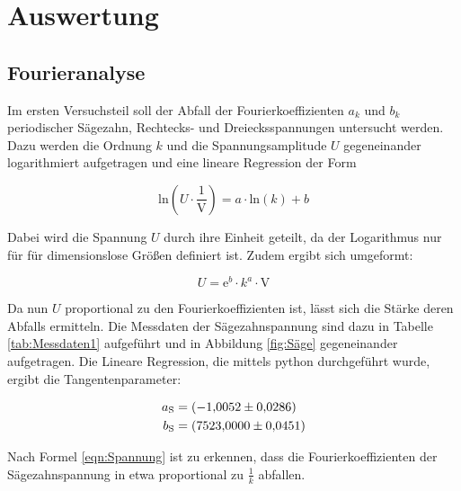 \section{Auswertung}
\label{sec:Auswertung}

\subsection{Fourieranalyse}

Im ersten Versuchsteil soll der Abfall der Fourierkoeffizienten $a_k$ und $b_k$
periodischer Sägezahn, Rechtecks- und Dreiecksspannungen untersucht werden.
Dazu werden die Ordnung $k$ und die Spannungsamplitude $U$ gegeneinander
logarithmiert aufgetragen und eine lineare Regression der Form

\begin{equation}
    \text{ln} \left(U \cdot \frac{1}{\si{\volt}} \right) = a \cdot \text{ln}(k) + b
\end{equation}

Dabei wird die Spannung $U$ durch ihre Einheit geteilt, da der Logarithmus nur für
für dimensionslose Größen definiert ist. Zudem ergibt sich umgeformt:

\begin{equation}
    U = \text{e}^b \cdot k^a \cdot \si{\volt}
    \label{eqn:Spannung}
\end{equation}

Da nun $U$ proportional zu den Fourierkoeffizienten ist, lässt sich die
Stärke deren Abfalls ermitteln.
Die Messdaten der Sägezahnspannung sind dazu in Tabelle \ref{tab:Messdaten1} aufgeführt und in 
Abbildung \ref{fig:Säge} gegeneinander aufgetragen.
Die Lineare Regression, die mittels python durchgeführt wurde, ergibt die Tangentenparameter:

\begin{align*}
    a_\text{S} &= \SI{-1.0052 \pm 0.0286}{} \\
    b_\text{S} &= \SI{07523 \pm 0.0451}{}
\end{align*}

Nach Formel \eqref{eqn:Spannung} ist zu erkennen, dass die Fourierkoeffizienten der Sägezahnspannung in etwa
proportional zu $\frac{1}{k}$ abfallen.

